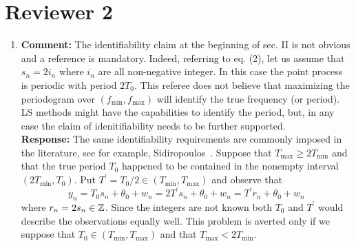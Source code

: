 \documentclass[a4paper,10pt]{article}
\begin{document}
\section*{Reviewer 2}


\begin{enumerate}

\item\textbf{Comment:}
 The identifiability claim at the beginning of sec. II is not obvious and a reference is mandatory. Indeed, referring to eq. (2), let us assume that $s_n = 2 i_n$ where $i_n$ are all non-negative integer. In this case the point process is periodic with period $2 T_0$. This referee does not believe that maximizing the periodogram over $(f_{\text{min}},f_{\text{max}})$ will identify the true frequency (or period). LS methods might have the capabilities to identify the period, but, in any case the claim of idenitifiability needs to be further supported.
\\
\textbf{Response:} The same identifiability requirements are commonly imposed in the literature, see for example, Sidiropoulos~\cite[eq. (2)]{Sidiropoulos2005}.  Suppose that $T_{\text{max}} \geq 2T_{\text{min}}$ and that the true period $T_0$ happened to be contained in the nonempty interval $(2T_{\text{min}}, T_0)$.  Put $T^\prime = T_0/2 \in (T_{\text{min}}, T_{\text{max}})$ and observe that
\[
y_n = T_0 s_n + \theta_0 + w_n = 2 T^\prime s_n + \theta_0 + w_n = T^\prime r_n + \theta_0 + w_n 
\]
where $r_n = 2 s_n \in {\mathbb Z}$.  Since the integers are not known both $T_0$ and $T^\prime$ would describe the observations equally well.  This problem is averted only if we suppose that $T_0 \in (T_{\text{min}}, T_{\text{max}})$ and that  $T_{\text{max}} < 2T_{\text{min}}$.




\end{enumerate}
\end{document}
